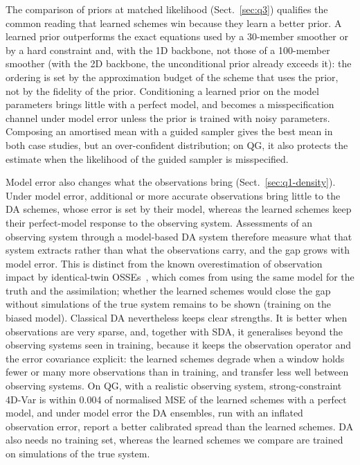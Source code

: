 The comparison of priors at matched likelihood (Sect.~\ref{sec:q3}) qualifies the common
reading that learned schemes win because they learn a better prior. A learned prior
outperforms the exact equations used by a 30-member smoother or by a hard constraint and, with
the 1D backbone, not those of a 100-member smoother (with the 2D backbone, the unconditional
prior already exceeds it): the ordering is set by the approximation budget of the scheme that
uses the prior, not by the fidelity of the prior. Conditioning a learned prior on the model
parameters brings little with a perfect model, and becomes a misspecification channel under
model error unless the prior is trained with noisy parameters. Composing an amortised mean
with a guided sampler gives the best mean in both case studies, but an over-confident
distribution; on QG, it also protects the estimate when the likelihood of the guided sampler
is misspecified.

Model error also changes what the observations bring (Sect.~\ref{sec:q1-density}). Under
model error, additional or more accurate observations bring little to the DA schemes, whose
error is set by their model, whereas the learned schemes keep their perfect-model response to
the observing system. Assessments of an observing system through a model-based DA system therefore measure what
that system extracts rather than what the observations carry, and the gap grows with model
error. This is distinct from the known overestimation of observation impact by identical-twin
OSSEs~\cite{halliwell_rigorous_2014,yu_evaluation_2019}, which comes from using the same model
for the truth and the assimilation; whether the
learned schemes would close the gap without simulations of the true system remains to be
shown (training on the biased model). Classical DA nevertheless keeps clear strengths. It is better when observations are
very sparse, and, together with SDA, it generalises beyond the observing systems seen in
training, because it keeps the observation operator and the error covariance explicit: the
learned schemes degrade when a window holds fewer or many more observations than in training,
and transfer less well between observing systems. On QG, with a realistic observing system,
strong-constraint 4D-Var is within 0.004 of normalised MSE of the learned schemes with a perfect
model, and under model error the DA ensembles, run with an inflated observation error, report a
better calibrated spread than the learned schemes. DA also needs no training
set, whereas the learned schemes we compare are trained on simulations of the true system.

